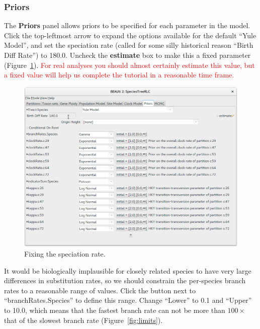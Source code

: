 \documentclass{article}
\begin{document}
\clearpage

\subsubsection*{Priors}

The \textbf{Priors} panel allows priors to be specified for each parameter in
the model. Click the top-leftmost arrow to expand the options available for the
default ``Yule Model'', and set the speciation rate (called for some silly
historical reason ``Birth Diff Rate'') to 180.0. Uncheck the
\textbf{estimate} box to make this a fixed parameter (Figure~\ref{fig:yule}). \textcolor{red}{For real
analyses you should almost certainly estimate this value, but a fixed value will
help us complete the tutorial in a reasonable time frame.}

\begin{figure}[htb!]
\centering
\includegraphics[width=\textwidth]{figures/beauti-yule.png}
\caption{Fixing the speciation rate.}
\label{fig:yule}
\end{figure}

It would be biologically implausible for closely related species to have very large
differences in substitution rates, so we should constrain the per-species branch
rates to a reasonable range of values. Click the button next to
``branchRates.Species'' to define this range. Change ``Lower'' to 0.1 and
``Upper'' to 10.0, which means that the fastest branch rate can not be more than
$100\times$ that of the slowest branch rate (Figure~\ref{fig:limits}).
\end{document}
